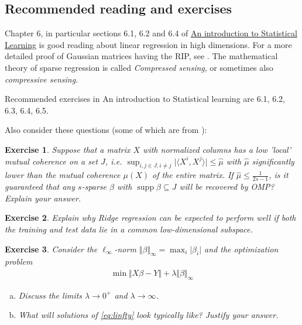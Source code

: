 \documentclass{article}
\DeclareMathOperator{\supp}{\mathrm{supp}}
\newcommand{\sprod}[1]{\langle #1 \rangle}
\newcommand{\sse}{\subseteq}
\newtheorem{exercise}{Exercise}
\newcommand{\abs}[1]{\vert #1 \vert}
\newcommand{\norm}[1]{\Vert #1 \Vert}
\begin{document}
\subsection{Recommended reading and exercises}
Chapter 6, in particular sections 6.1, 6.2 and 6.4 of \href{https://www.statlearning.com/}{An introduction to Statistical Learning} is good reading about linear regression in high dimensions. For a more detailed proof of Gaussian matrices having the RIP, see \cite{baraniuk2008simple}. The mathematical theory of sparse regression is called \emph{Compressed sensing}, or sometimes also \emph{compressive sensing}.

\smallskip

Recommended exercises in An introduction to Statistical learning are 6.1, 6.2, 6.3, 6.4, 6.5.
\smallskip

Also consider these questions (some of which are from \cite{foucart2011hard}):

\begin{exercise}
    Suppose that a matrix $X$ with normalized columns has a low 'local' mutual coherence on a set $J$, i.e. $\sup_{i,j \in J, i\neq j} \abs{\sprod{X^i,X^j}} \leq \widehat{\mu}$ with $\widehat{\mu}$ significantly lower than the mutual coherence $\mu(X)$ of the entire matrix. If $\widehat{\mu}\leq \tfrac{1}{2s-1}$, is it guaranteed that any $s$-sparse $\beta$ with $\supp \beta \sse J$ will be recovered by OMP? Explain your answer.
\end{exercise}

\begin{exercise}
    Explain why Ridge regression can be expected to perform well if both the training and test data lie in a common low-dimensional subspace.  
\end{exercise}

\begin{exercise}
    Consider the $\ell_\infty$-norm $\norm{\beta}_\infty = \max_{i} \abs{\beta_i}$ and the optimization problem 
    \begin{align}
        \min \norm{X\beta - Y} + \lambda \norm{\beta}_\infty \label{eq:linfty}
    \end{align}
    \begin{enumerate}[(a)]
        \item Discuss the limits $\lambda \to 0^+$ and $\lambda \to \infty$.
        \item What will solutions of \eqref{eq:linfty} look typically like? Justify your answer.
    \end{enumerate}
\end{exercise}
\end{document}
